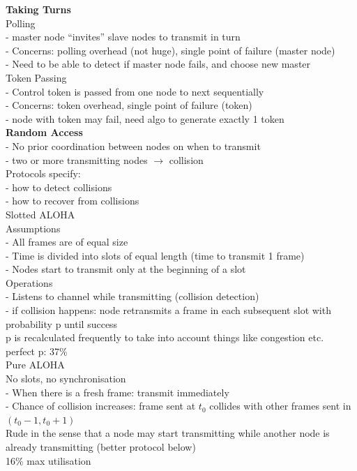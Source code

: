 \documentclass[10pt, a4paper]{article}
\newcommand{\blue}[1]{{\color{MidnightBlue}#1}}
\newcommand{\red}[1]{{\color{red}#1}}
\begin{document}
\begin{multicols*}{3}
		\textbf{Taking Turns}\\
		Polling\\
		- master node ``invites'' slave nodes to transmit in turn\\
		- Concerns: polling overhead (not huge), single point of failure (master node)\\
		- Need to be able to detect if master node fails, and choose new master\\

		Token Passing\\
		- Control token is passed from one node to next sequentially\\
		- Concerns: token overhead, single point of failure (token)\\
		- node with token may fail, need algo to generate exactly 1 token\\

		\textbf{Random Access}\\
		- No prior coordination between nodes on when to transmit\\
		- two or more transmitting nodes $\rightarrow$ \red{collision}\\
		Protocols specify:\\
		- how to detect collisions\\
		- how to recover from collisions\\

		Slotted ALOHA\\
		\blue{Assumptions}\\
		- All frames are of equal size\\
		- Time is divided into slots of equal length (time to transmit 1 frame)\\
		- Nodes start to transmit only at the beginning of a slot\\

		\blue{Operations}\\
		- Listens to channel while transmitting (collision detection)\\
		- \red{if collision happens:} node \blue{retransmits} a frame in each \blue{subsequent slot} with probability \red{p} until success\\
		\red{p} is recalculated frequently to take into account things like congestion etc. \\
		perfect p: 37\%\\

		Pure ALOHA\\
		No slots, no synchronisation\\
		- When there is a fresh frame: transmit immediately\\
		- Chance of collision increases: frame sent at $t_{0}$ collides with other frames sent in $(t_{0}-1, t_{0} + 1)$\\
		Rude in the sense that a node may start transmitting while another node is already transmitting (better protocol below)\\
		16\% max utilisation\\


\end{multicols*}
\end{document}
